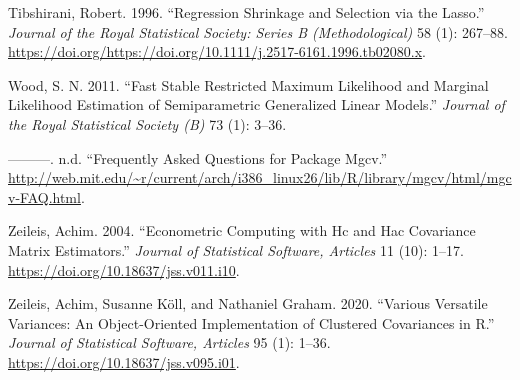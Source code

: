 \documentclass{article}
\begin{document}
\leavevmode\hypertarget{ref-https:ux2fux2fdoi.orgux2f10.1111ux2fj.2517-6161.1996.tb02080.x}{}%
Tibshirani, Robert. 1996. ``Regression Shrinkage and Selection via the Lasso.'' \emph{Journal of the Royal Statistical Society: Series B (Methodological)} 58 (1): 267--88. \url{https://doi.org/https://doi.org/10.1111/j.2517-6161.1996.tb02080.x}.

\leavevmode\hypertarget{ref-mgcv}{}%
Wood, S. N. 2011. ``Fast Stable Restricted Maximum Likelihood and Marginal Likelihood Estimation of Semiparametric Generalized Linear Models.'' \emph{Journal of the Royal Statistical Society (B)} 73 (1): 3--36.

\leavevmode\hypertarget{ref-wood}{}%
---------. n.d. ``Frequently Asked Questions for Package Mgcv.'' \url{http://web.mit.edu/~r/current/arch/i386_linux26/lib/R/library/mgcv/html/mgcv-FAQ.html}.

\leavevmode\hypertarget{ref-JSSv011i10}{}%
Zeileis, Achim. 2004. ``Econometric Computing with Hc and Hac Covariance Matrix Estimators.'' \emph{Journal of Statistical Software, Articles} 11 (10): 1--17. \url{https://doi.org/10.18637/jss.v011.i10}.

\leavevmode\hypertarget{ref-JSSv095i01}{}%
Zeileis, Achim, Susanne Köll, and Nathaniel Graham. 2020. ``Various Versatile Variances: An Object-Oriented Implementation of Clustered Covariances in R.'' \emph{Journal of Statistical Software, Articles} 95 (1): 1--36. \url{https://doi.org/10.18637/jss.v095.i01}.



\end{document}
